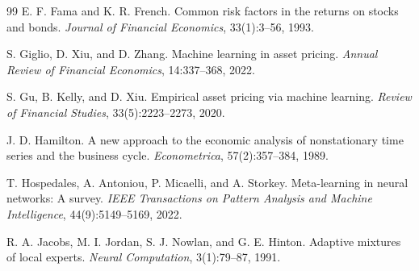 \documentclass[10pt,twocolumn]{article}
\begin{document}
\begin{thebibliography}{99}
E. F. Fama and K. R. French.
\newblock Common risk factors in the returns on stocks and bonds.
\newblock \emph{Journal of Financial Economics}, 33(1):3--56, 1993.


S. Giglio, D. Xiu, and D. Zhang.
\newblock Machine learning in asset pricing.
\newblock \emph{Annual Review of Financial Economics}, 14:337--368, 2022.

S. Gu, B. Kelly, and D. Xiu.
\newblock Empirical asset pricing via machine learning.
\newblock \emph{Review of Financial Studies}, 33(5):2223--2273, 2020.


J. D. Hamilton.
\newblock A new approach to the economic analysis of nonstationary time series
  and the business cycle.
\newblock \emph{Econometrica}, 57(2):357--384, 1989.


T. Hospedales, A. Antoniou, P. Micaelli, and A. Storkey.
\newblock Meta-learning in neural networks: A survey.
\newblock \emph{IEEE Transactions on Pattern Analysis and Machine Intelligence},
  44(9):5149--5169, 2022.


R. A. Jacobs, M. I. Jordan, S. J. Nowlan, and G. E. Hinton.
\newblock Adaptive mixtures of local experts.
\newblock \emph{Neural Computation}, 3(1):79--87, 1991.



\end{thebibliography}
\end{document}
